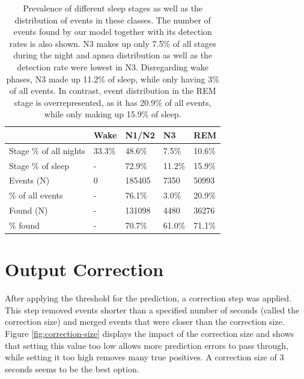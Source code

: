 \renewcommand{\arraystretch}{1.5}
\begin{table}
    \centering
    \begin{tabular}{ l p{1.6cm} p{1.6cm} p{1.6cm} p{1.6cm} }
        & Wake & N1/N2 & N3 & REM \\
        \hline
        Stage \% of all nights & 33.3\% & 48.6\% & 7.5\% & 10.6\% \\
        Stage \% of sleep & - & 72.9\% & 11.2\% & 15.9\% \\
        \hline
        Events (N) & 0 & 185405 & 7350 & 50993 \\
        \% of all events & - & 76.1\% & 3.0\% & 20.9\% \\
        \hline
        Found (N) & - & 131098 & 4480 & 36276 \\
        \% found & - & 70.7\% & 61.0\% & 71.1\% \\
    \end{tabular}
    \caption{Prevalence of different sleep stages as well as the distribution of events in these classes. The number of events found by our model together with its detection rates is also shown. N3 makes up only 7.5\% of all stages during the night and apnea distribution as well as the detection rate were lowest in N3. Disregarding wake phases, N3 made up 11.2\% of sleep, while only having 3\% of all events. In contrast, event distribution in the REM stage is overrepresented, as it has 20.9\% of all events, while only making up 15.9\% of sleep. \label{tab:sleep-stage-distribution}}
\end{table}

\section{Output Correction}

After applying the threshold for the prediction, a correction step was applied. This step removed events shorter than a specified number of seconds (called the correction size) and merged events that were closer than the correction size. Figure \ref{fig:correction-size} displays the impact of the correction size and shows that setting this value too low allows more prediction errors to pass through, while setting it too high removes many true positives. A correction size of 3 seconds seems to be the best option.


